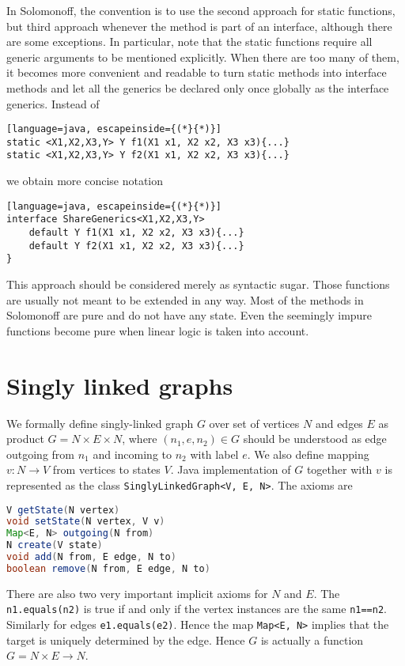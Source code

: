 \documentclass[12pt]{article}
\begin{document}
In Solomonoff, the convention is to use the second approach for static functions, but third approach whenever the method is part of an interface, although there are some exceptions. In particular, note that the static functions require all generic arguments to be mentioned explicitly. When there are too many of them, it becomes more convenient and readable to turn static methods into interface methods and let all the generics be declared only once globally as the interface generics. Instead of
 \begin{lstlisting}[language=java, escapeinside={(*}{*)}]
static <X1,X2,X3,Y> Y f1(X1 x1, X2 x2, X3 x3){...}
static <X1,X2,X3,Y> Y f2(X1 x1, X2 x2, X3 x3){...}
\end{lstlisting}
we obtain more concise notation
 \begin{lstlisting}[language=java, escapeinside={(*}{*)}]
interface ShareGenerics<X1,X2,X3,Y>
    default Y f1(X1 x1, X2 x2, X3 x3){...}
    default Y f2(X1 x1, X2 x2, X3 x3){...}
}
\end{lstlisting}
This approach should be considered merely as syntactic sugar. Those functions are usually not meant to be extended in any way. Most of the methods in Solomonoff are pure and do not have any state. Even the seemingly impure functions become pure when linear logic is taken into account. 


 
 \section{Singly linked graphs}
 
We formally define singly-linked graph $G$ over set of vertices $N$ and edges $E$ as product $G= N \times E \times N$, where $(n_1,e,n_2)\in G$ should be understood as edge outgoing from $n_1$ and incoming to $n_2$ with label $e$. We also define mapping $v : N \rightarrow V$ from vertices to states $V$.
Java implementation of $G$ together with $v$ is represented as the class \texttt{SinglyLinkedGraph<V, E, N>}. The axioms are

 \begin{lstlisting}[language=java]
V getState(N vertex)
void setState(N vertex, V v)
Map<E, N> outgoing(N from)
N create(V state)
void add(N from, E edge, N to)
boolean remove(N from, E edge, N to)
\end{lstlisting}


There are also two very important implicit axioms for $N$ and $E$. The \texttt{n1.equals(n2)} is true if and only if the vertex instances are the same \texttt{n1==n2}. Similarly for edges \texttt{e1.equals(e2)}. Hence the map \texttt{Map<E, N>} implies that the target is uniquely determined by the edge. Hence $G$ is actually a function $G= N \times E \rightarrow N$.
\end{document}
